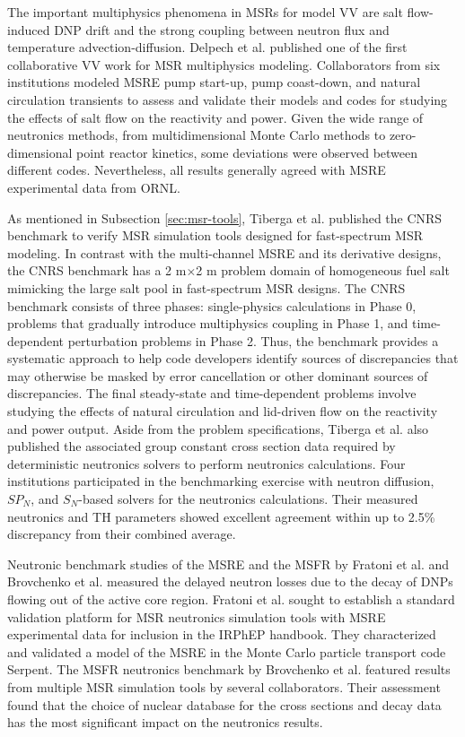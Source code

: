 The important multiphysics phenomena in \glspl{MSR} for model \gls{VV} are salt flow-induced
\gls{DNP} drift and the strong coupling between neutron flux and temperature advection-diffusion.
Delpech et al. \cite{delpech_benchmark_2003} published one of the first collaborative \gls{VV} work
for \gls{MSR} multiphysics modeling. Collaborators
from six institutions modeled \gls{MSRE} pump start-up, pump coast-down, and natural
circulation transients to assess and validate their models and codes for studying the effects of
salt flow on the reactivity and power. Given the wide range of neutronics methods, from
multidimensional Monte Carlo methods to zero-dimensional point reactor kinetics, some deviations
were observed between different codes. Nevertheless, all results generally agreed
with \gls{MSRE} experimental data from \gls{ORNL}.

As mentioned in Subsection \ref{sec:msr-tools}, Tiberga et al. \cite{tiberga_results_2020}
published the CNRS benchmark to verify \gls{MSR} simulation tools designed for
fast-spectrum \gls{MSR} modeling. In contrast with the multi-channel \gls{MSRE} and its derivative
designs, the CNRS benchmark has a 2 m$\times$2 m problem domain of homogeneous fuel salt mimicking
the large salt pool in fast-spectrum \gls{MSR} designs. The CNRS benchmark consists of three
phases: single-physics calculations in Phase 0, problems that gradually
introduce multiphysics coupling in Phase 1, and time-dependent perturbation problems in Phase
2. Thus, the benchmark provides a systematic approach to help code developers
identify sources of discrepancies that may otherwise be masked by error cancellation or other
dominant sources of discrepancies. The final steady-state and time-dependent problems involve
studying the effects of natural circulation and lid-driven flow on the reactivity and power output.
Aside from the problem specifications, Tiberga et al. also published the associated group
constant cross section data required by deterministic neutronics solvers to perform neutronics
calculations. Four institutions participated in the benchmarking exercise with neutron diffusion,
$SP_N$, and $S_N$-based solvers for the neutronics calculations. Their measured neutronics and
\gls{TH} parameters showed excellent agreement within up to 2.5\% discrepancy from their combined
average.

Neutronic benchmark studies of the \gls{MSRE} and the \gls{MSFR} by Fratoni et al.
\cite{fratoni_molten_2020} and Brovchenko et al. \cite{brovchenko_neutronic_2019} measured the
delayed neutron losses due to the decay of \glspl{DNP} flowing out of the active core region.
Fratoni et al. sought to establish a standard validation platform for \gls{MSR} neutronics
simulation tools with \gls{MSRE} experimental data for inclusion in the \gls{IRPhEP} handbook.
They characterized and validated a model of the \gls{MSRE} in the Monte Carlo particle transport
code Serpent. The \gls{MSFR} neutronics benchmark by Brovchenko et al. featured results
from multiple \gls{MSR} simulation tools by several collaborators. Their assessment found that
the choice of nuclear database for the cross sections and decay data has the most significant
impact on the neutronics results.


